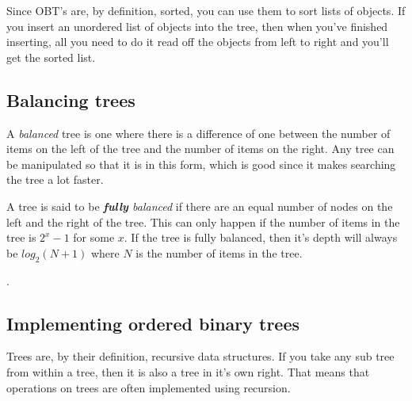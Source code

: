 Since OBT's are, by definition, sorted, you can use them to sort lists of
objects. If you insert an unordered list of objects into the tree, then when
you've finished inserting, all you need to do it read off the objects from left
to right and you'll get the sorted list.

\subsection*{Balancing trees}

A {\it balanced} tree is one where there is a difference of one between the
number of items on the left of the tree and the number of items on the right.
Any tree can be manipulated so that it is in this form, which is good since it
makes searching the tree a lot faster.

A tree is said to be {\it {\bf fully} balanced} if there are an equal number of
nodes on the left and the right of the tree. This can only happen if the number
of items in the tree is $2^x - 1$ for some $x$. If the tree is fully balanced,
then it's depth will always be $log_2(N + 1)$ where $N$ is the number of items
in the tree.

.

\subsection*{Implementing ordered binary trees}

Trees are, by their definition, recursive data structures. If you take any sub
tree from within a tree, then it is also a tree in it's own right. That means
that operations on trees are often implemented using recursion.

